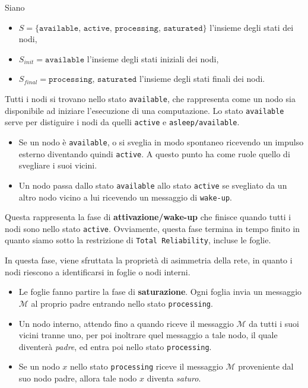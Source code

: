 Siano
\begin{itemize}
    \item $S = \{\texttt{available, active, processing, saturated}\}$ l'insieme degli stati dei nodi,
    \item $S_{init} = \texttt{available}$ l'insieme degli stati iniziali dei nodi,
    \item $S_{final} = \texttt{processing, saturated}$ l'insieme degli stati finali dei nodi.
\end{itemize}

Tutti i nodi si trovano nello stato \texttt{available}, che rappresenta come un nodo sia disponibile ad iniziare l'esecuzione di una computazione. Lo stato \texttt{available} serve per distiguire i nodi da quelli \texttt{active} e \texttt{asleep/available}.
\begin{itemize}
    \item Se un nodo è \texttt{available}, o si sveglia in modo spontaneo ricevendo un impulso esterno diventando quindi \texttt{active}. A questo punto ha come ruole quello di svegliare i suoi vicini.
    \item Un nodo passa dallo stato \texttt{available} allo stato \texttt{active} se svegliato da un altro nodo vicino a lui ricevendo un messaggio di \texttt{wake-up}.
\end{itemize}
Questa rappresenta la fase di \textbf{attivazione/wake-up} che finisce quando tutti i nodi sono nello stato \texttt{active}. Ovviamente, questa fase termina in tempo finito in quanto siamo sotto la restrizione di \texttt{Total Reliability}, incluse le foglie.


In questa fase, viene sfruttata la proprietà di asimmetria della rete, in quanto i nodi riescono a identificarsi in foglie o nodi interni. 

\begin{itemize}
    \item Le foglie fanno partire la fase di \textbf{saturazione}. Ogni foglia invia un messaggio $\mathcal{M}$ al proprio padre entrando nello stato \texttt{processing}. 
    \item Un nodo interno, attendo fino a quando riceve il messaggio $\mathcal{M}$ da tutti i suoi vicini tranne uno, per poi inoltrare quel messaggio a tale nodo, il quale diventerà \textit{padre}, ed entra poi nello stato \texttt{processing}.
    \item Se un nodo $x$ nello stato \texttt{processing} riceve il messaggio $\mathcal{M}$ proveniente dal suo nodo padre, allora tale nodo $x$ diventa \textit{saturo}.
\end{itemize}

